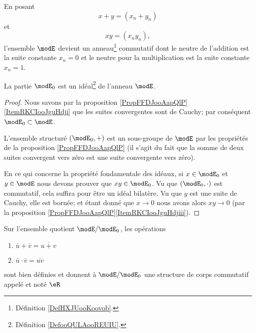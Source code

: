 En posant 
\begin{equation}
    x+y=(x_n+y_n)
\end{equation}
et
\begin{equation}
    xy=(x_ny_n),
\end{equation}
l'ensemble \( \modE\) devient un anneau\footnote{Définition \ref{DefHXJUooKoovob}.} commutatif dont le neutre de l'addition est la suite constante \( x_n=0\) et le neutre pour la multiplication est la suite constante \( x_n=1\).

\begin{proposition}
    La partie \( \modE_0\) est un idéal\footnote{Définition \ref{DefooQULAooREUIU}.} de l'anneau \( \modE\).
\end{proposition}

\begin{proof}
    Nous savons par la proposition \ref{PropFFDJooAapQlP}\ref{ItemRKCIooJguHdji} que les suites convergentes sont de Cauchy; par conséquent \( \modE_0\subset\modE\).

    L'ensemble structuré \( (\modE_0,+)\) est un sous-groupe de \( \modE\) par les propriétés de la proposition \ref{PropFFDJooAapQlP} (il s'agit du fait que la somme de deux suites convergent vers zéro est une suite convergente vers zéro).

    En ce qui concerne la propriété fondamentale des idéaux, si \( x\in\modE_0\) et \( y\in\modE\) nous devons prouver que \( xy\in \modE_0\). Vu que \( (\modE_0,\cdot)\) est commutatif, cela suffira pour être un idéal bilatère. Vu que \( y\) est une suite de Cauchy, elle est bornée; et étant donné que \( x\to 0\) nous avons alors \( xy\to 0\) (par la proposition \ref{PropFFDJooAapQlP}\ref{ItemRKCIooJguHdjiii}).
\end{proof}

\begin{theoremDef}       \label{DefooFKYKooOngSCB}
    Sur l'ensemble quotient \( \modE/\modE_0\), les opérations
    \begin{enumerate}
        \item
            \( \bar u+\bar v=\overline{ u+v }\)
        \item
            \( \bar u\cdot \bar v=\overline{ uv }\)
    \end{enumerate}
    sont bien définies et donnent à \( \modE/\modE_0\) une structure de corps commutatif appelé  et noté \( \eR\)
\end{theoremDef}

